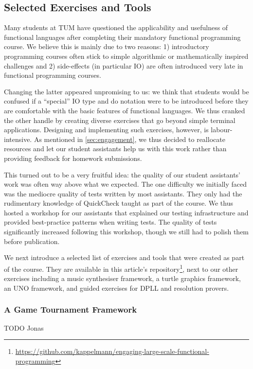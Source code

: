 \subsection{Selected Exercises and Tools}\label{sec:selected_exercises}

Many students at TUM have questioned the
applicability and usefulness
of functional languages after completing
their mandatory functional programming course.
We believe this is mainly due to two reasons:
1) introductory programming courses often stick
to simple algorithmic or mathematically inspired challenges and
2) side-effects (in particular IO)
are often introduced very late
in functional programming courses.

Changing the latter appeared unpromising to us:
we think that students would be confused
if a ``special'' IO type and do notation were to
be introduced before they are comfortable
with the basic features of functional
languages.
We thus cranked the other handle
by creating diverse exercises that go beyond
simple terminal applications.
Designing and implementing such exercises,
however, is labour-intensive.
As mentioned in \cref{sec:engagement},
we thus decided to reallocate resources and
let our student assistants help us with this work
rather than providing feedback for homework submissions.

This turned out to be a very fruitful idea:
the quality of our student assistants' work was often way above what
we expected.
The one difficulty we initially faced was the mediocre quality of
tests written by most assistants.
They only had the rudimentary knowledge of QuickCheck taught as part of
the course.
We thus hosted a workshop for our assistants that explained
our testing infrastructure and provided best-practice
patterns when writing tests.
The quality of tests significantly increased following this workshop,
though we still had to polish them before publication.

We next introduce a selected list of exercises and tools
that were created as part of the course.
They are available in this article's repository\footnote{\url{https://github.com/kappelmann/engaging-large-scale-functional-programming}},
next to our other exercises including
a music synthesiser framework,
a turtle graphics framework,
an UNO framework,
and guided exercises for DPLL and resolution provers.

\subsubsection{A Game Tournament Framework}
TODO Jonas

